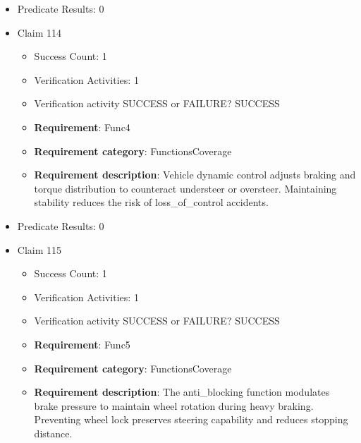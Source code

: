 \documentclass{article}
\begin{document}
\begin{itemize}
\begin{itemize}
						\item \textbf{Requirement}: Func3 
						\item \textbf{Requirement category}: FunctionsCoverage 
						\item \textbf{Requirement description}: ASR monitors wheel traction and reduces torque when slip exceeds defined limits. Limiting wheel slip during acceleration improves drivability and stability.
					
				\end{itemize}
				
									    
				\item Predicate Results: 0

  				  \item Claim 114
				\begin{itemize}
			    	\item Success Count: 1 
			    	\item Verification Activities: 1
					\item Verification activity SUCCESS or FAILURE? SUCCESS
		
						\item \textbf{Requirement}: Func4 
						\item \textbf{Requirement category}: FunctionsCoverage 
						\item \textbf{Requirement description}: Vehicle dynamic control adjusts braking and torque distribution to counteract understeer or oversteer. Maintaining stability reduces the risk of loss_of_control accidents.
					
				\end{itemize}
				
									    
				\item Predicate Results: 0

  				  \item Claim 115
				\begin{itemize}
			    	\item Success Count: 1 
			    	\item Verification Activities: 1
					\item Verification activity SUCCESS or FAILURE? SUCCESS
		
						\item \textbf{Requirement}: Func5 
						\item \textbf{Requirement category}: FunctionsCoverage 
						\item \textbf{Requirement description}: The anti_blocking function modulates brake pressure to maintain wheel rotation during heavy braking. Preventing wheel lock preserves steering capability and reduces stopping distance.
					

\end{itemize}
\end{itemize}
\end{document}
